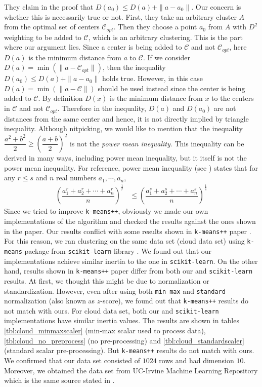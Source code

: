 \documentclass[12pt]{article}
\newcommand{\C}{\mathcal{C}}
\begin{document}
	They claim in the proof that $D(a_0)\leq D(a)+\|a-a_0\|$. Our concern is whether this is necessarily true or not. First, they take an arbitrary cluster $A$ from the optimal set of centers $\C_{opt}$. Then they choose a point $a_0$ from $A$ with $D^2$ weighting to be added to $\C$, which is an arbitrary clustering. This is the part where our argument lies. Since a center is being added to $\C$ and not $\C_{opt}$, here $D(a)$ is the minimum distance from $a$ to $\C$. If we consider $D(a)=\min(\|a-\C_{opt}\|)$, then the inequality $D(a_0)\leq D(a)+\|a-a_0\|$ holds true. However, in this case $D(a)=\min(\|a-\C\|)$ should be used instead since the center is being added to $\C$. By definition $D(x)$ is the minimum distance from $x$ to the centers in $\C$ and not $\C_{opt}$. Therefore in the inequality, $D(a)$ and $D(a_0)$ are not distances from the same center and hence, it is not directly implied by triangle inequality. Although nitpicking, we would like to mention that the inequality $\dfrac{a^2+b^2}{2} \geq \left(\dfrac{a+b}{2}\right)^2$ is not the \textit{power mean inequality}. This inequality can be derived in many ways, including power mean inequality, but it itself is not the power mean inequality. For reference, power mean inequality (see \textcite{hardy_littlewood_polya_1934}) states that for any $r\leq s$ and $n$ real numbers $a_1,\cdots,a_n$,
		\begin{align*}
			\left(\dfrac{a_1^r+a_2^r+\cdots+a_n^r}{n}\right)^{\frac{1}{r}} & \leq \left(\dfrac{a_1^s+a_2^s+\cdots+a_n^s}{n}\right)^{\frac{1}{s}}
		\end{align*}
	Since we tried to improve \texttt{k-means++}, obviously we made our own implementations of the algorithm and checked the results against the ones shown in the paper. Our results conflict with some results shown in \texttt{k-means++} paper \textcite{arthur_vassilvitskii_2007}. For this reason, we ran clustering on the same data set (cloud data set) using \texttt{k-means} package from \texttt{scikit-learn} library \textcite{pedregosa__et_al_2011}. We found out that our implementations achieve similar inertia to the one in \texttt{scikit-learn}. On the other hand, results shown in \texttt{k-means++} paper differ from both our and \texttt{scikit-learn} results. At first, we thought this might be due to normalization or standardization. However, even after using both \texttt{min max} and \texttt{standard} normalization (also known as $z$-score), we found out that \texttt{k-means++} results do not match with ours. For cloud data set, both our and \texttt{scikit-learn} implementations have similar inertia values. The results are shown in tables \ref{tbl:cloud_minmaxscaler} (min-max scalar used to process data), \ref{tbl:cloud_no_preprocess} (no pre-processing) and \ref{tbl:cloud_standardscaler} (standard scalar pre-processing). But \texttt{k-means++} results \textcite[Table $3$]{arthur_vassilvitskii_2007} do not match with ours. We confirmed that our data set consisted of $1024$ rows and had dimension $10$. Moreover, we obtained the data set from UC-Irvine Machine Learning Repository which is the same source stated in \textcite[Section $6.1$]{arthur_vassilvitskii_2007}.
\end{document}
